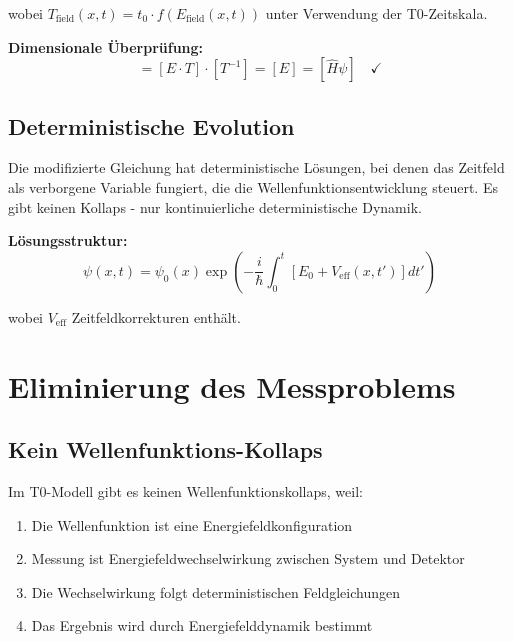 \documentclass[12pt,a4paper]{report}
\begin{document}
	wobei $T_{\text{field}}(x,t) = t_0 \cdot f(E_{\text{field}}(x,t))$ unter Verwendung der T0-Zeitskala.
	
	\textbf{Dimensionale Überprüfung:}
	\begin{equation}
		[i \hbar \partial_t \psi] = [E \cdot T] \cdot [T^{-1}] = [E] = [\hat{H}\psi] \quad \checkmark
	\end{equation}
	
	\subsection{Deterministische Evolution}
	\label{subsec:deterministic_evolution}
	
	Die modifizierte Gleichung hat deterministische Lösungen, bei denen das Zeitfeld als verborgene Variable fungiert, die die Wellenfunktionsentwicklung steuert. Es gibt keinen Kollaps - nur kontinuierliche deterministische Dynamik.
	
	\textbf{Lösungsstruktur:}
	\begin{equation}
		\psi(x,t) = \psi_0(x) \exp\left(-\frac{i}{\hbar} \int_0^t \left[E_0 + V_{\text{eff}}(x,t')\right] dt'\right)
	\end{equation}
	
	wobei $V_{\text{eff}}$ Zeitfeldkorrekturen enthält.
	
	\section{Eliminierung des Messproblems}
	\label{sec:measurement_problem}
	
	\subsection{Kein Wellenfunktions-Kollaps}
	\label{subsec:no_collapse}
	
	Im T0-Modell gibt es keinen Wellenfunktionskollaps, weil:
	
	\begin{enumerate}
		\item Die Wellenfunktion ist eine Energiefeldkonfiguration
		\item Messung ist Energiefeldwechselwirkung zwischen System und Detektor
		\item Die Wechselwirkung folgt deterministischen Feldgleichungen
		\item Das Ergebnis wird durch Energiefelddynamik bestimmt
	\end{enumerate}
	
\end{document}

